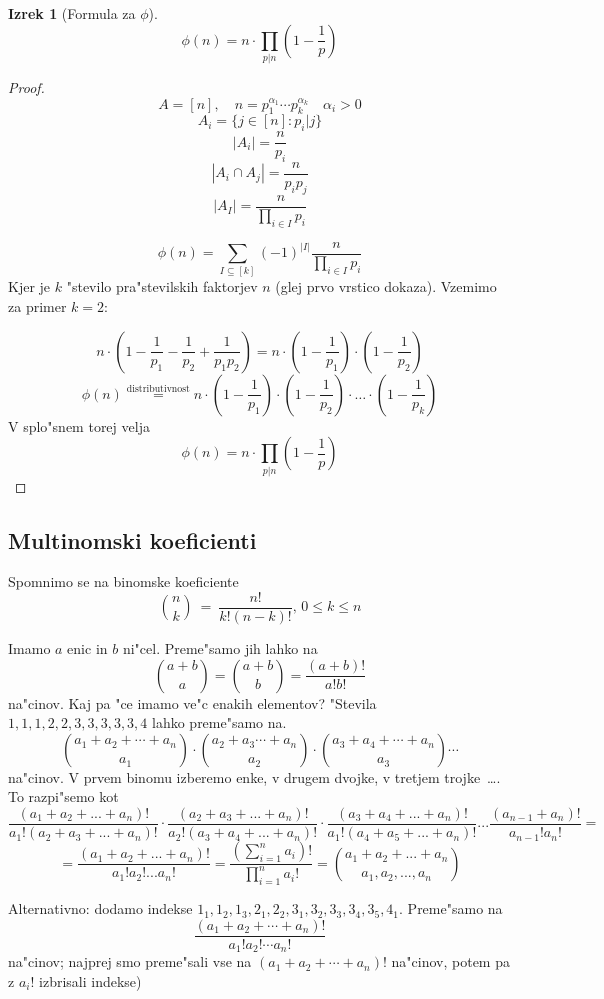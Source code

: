 \documentclass[a4paper,12pt]{article}
\theoremstyle{definition}
\newtheorem{theorem}[counter]{Izrek}
\theoremstyle{remark}
\begin{document}
\begin{theorem}[Formula za $\phi$]
	\[\phi (n) = n \cdot \prod_{p | n} (1 - \frac{1}{p})\]
\end{theorem}
\begin{proof}
	\[A = [n], \quad n = p_1^{\alpha_1} \cdots p_k^{\alpha_k} \quad \alpha_i > 0\]
	\[A_i = \{j \in [n] : p_i | j\} \]
	\[|A_i| = \frac{n}{p_i}\]
	\[|A_i \cap A_j| = \frac{n}{p_i p_j}\]
	\[|A_I| = \frac{n}{\displaystyle \prod_{i \in I} p_i}\]

	\[\phi (n) = \sum_{I \subseteq [k]} (-1)^{|I|} \frac{n}{\displaystyle \prod_{i \in I} p_i}\]
	Kjer je $k$ "stevilo pra"stevilskih faktorjev $n$ (glej prvo vrstico dokaza). Vzemimo za primer $k = 2$:

	\[n\cdot(1 - \frac{1}{p_1} - \frac{1}{p_2} + \frac{1}{p_1 p_2}) = n\cdot(1 - \frac{1}{p_1})\cdot(1 - \frac{1}{p_2})\]
	\[\phi (n) \stackrel{\text{distributivnost}}{=}  n\cdot(1 - \frac{1}{p_1})\cdot(1 - \frac{1}{p_2})\cdot \ldots \cdot(1 - \frac{1}{p_k})\]
	V splo"snem torej velja
	\[\phi (n) = n \cdot \prod_{p | n} (1 - \frac{1}{p})\]
\end{proof}

\subsection{Multinomski koeficienti}
Spomnimo se na binomske koeficiente
\[\binom{n}{k} \ = \ \frac{n!}{k! (n - k)!}\text{, } 0 \leqslant k \leqslant n\]

Imamo $a$ enic in $b$ ni"cel. Preme"samo jih lahko na
\[\binom{a + b}{a} = \binom{a + b}{b} = \frac{(a+b)!}{a!b!}\]
na"cinov. Kaj pa "ce imamo ve"c enakih elementov? "Stevila $1,1,1,2,2,3,3,3,3,3,4$ lahko preme"samo na.
\[\binom{a_1 + a_2 + \cdots + a_n}{a_1} \cdot \binom{a_2 + a_3 \cdots + a_n}{a_2} \cdot \binom{a_3 + a_4 + \cdots + a_n}{a_3} \cdots\]
na"cinov. V prvem binomu izberemo enke, v drugem dvojke, v tretjem trojke~\ldots. To razpi"semo kot
\[\frac{(a_1 + a_2 + ... + a_n)!}{a_1!(a_2 + a_3 + ... + a_n)!} \cdot \frac{(a_2 + a_3 + ... + a_n)!}{a_2!(a_3 + a_4 + ... + a_n)!} \cdot \frac{(a_3 + a_4 + ... + a_n)!}{a_1!(a_4 + a_5 + ... + a_n)!} ... \frac{(a_{n-1}+a_n)!}{a_{n-1}!a_n!} =\]
\[= \frac{(a_1 + a_2 + ... + a_n)!}{a_1!a_2!...a_n!} = \frac{(\displaystyle \sum_{i = 1}^n a_i)!}{\displaystyle \prod_{i = 1}^n a_i!} = \binom{a_1 + a_2 + ... + a_n}{a_1, a_2, ..., a_n}\]

Alternativno: dodamo indekse $1_1, 1_2, 1_3, 2_1, 2_2, 3_1, 3_2, 3_3, 3_4, 3_5, 4_1$. Preme"samo na
\[\frac{(a_1 + a_2 + \cdots + a_n)!}{a_1!a_2! \cdots a_n!}\]
na"cinov; najprej smo preme"sali vse na $(a_1 + a_2 + \cdots + a_n)!$ na"cinov, potem pa z $a_i!$ izbrisali indekse)
\end{document}
